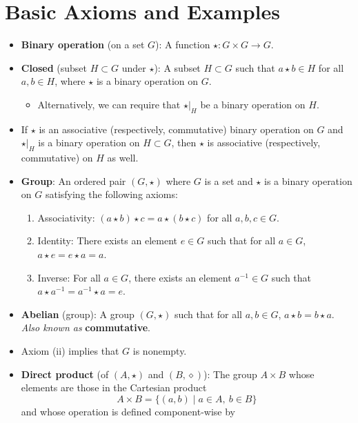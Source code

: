 \documentclass[../notes.tex]{subfiles}
\begin{document}
\section{Basic Axioms and Examples}
\begin{itemize}
    \item {}\textbf{Binary operation} (on a set $G$): A function $\star:G\times G\to G$.
    \item \textbf{Closed} (subset $H\subset G$ under $\star$): A subset $H\subset G$ such that $a\star b\in H$ for all $a,b\in H$, where $\star$ is a binary operation on $G$.
    \begin{itemize}
        \item Alternatively, we can require that $\star|_H$ be a binary operation on $H$.
    \end{itemize}
    \item If $\star$ is an associative (respectively, commutative) binary operation on $G$ and $\star|_H$ is a binary operation on $H\subset G$, then $\star$ is associative (respectively, commutative) on $H$ as well.
    \item \textbf{Group}: An ordered pair $(G,\star)$ where $G$ is a set and $\star$ is a binary operation on $G$ satisfying the following axioms:
    \begin{enumerate}[label={(\roman*)}]
        \item Associativity: $(a\star b)\star c=a\star(b\star c)$ for all $a,b,c\in G$.
        \item Identity: There exists an element $e\in G$ such that for all $a\in G$, $a\star e=e\star a=a$.
        \item Inverse: For all $a\in G$, there exists an element $a^{-1}\in G$ such that $a\star a^{-1}=a^{-1}\star a=e$.
    \end{enumerate}
    \item \textbf{Abelian} (group): A group $(G,\star)$ such that for all $a,b\in G$, $a\star b=b\star a$. \emph{Also known as} \textbf{commutative}.
    \item Axiom (ii) implies that $G$ is nonempty.
    \item \textbf{Direct product} (of $(A,\star)$ and $(B,\diamond)$): The group $A\times B$ whose elements are those in the Cartesian product
    \begin{equation*}
        A\times B = \{(a,b)\mid a\in A,\ b\in B\}
    \end{equation*}
    and whose operation is defined component-wise by
    \begin{equation*}

\end{equation*}
\end{itemize}
\end{document}
